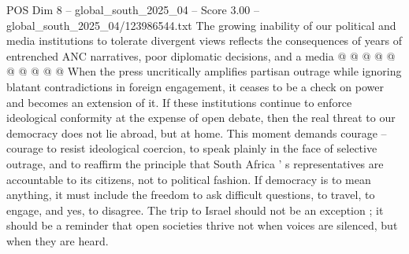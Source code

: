 \begin{textsample}{POS Dim 8 – global\_south\_2025\_04 – Score 3.00 – global\_south\_2025\_04/123986544.txt}
The growing inability of our political and media institutions to tolerate divergent views reflects the consequences of years of entrenched ANC narratives, poor diplomatic decisions, and a media @ @ @ @ @ @ @ @ @ @ When the press uncritically amplifies partisan outrage while ignoring blatant contradictions in foreign engagement, it ceases to be a check on power and becomes an extension of it.
If these institutions continue to enforce ideological conformity at the expense of open debate, then the real threat to our democracy does not lie abroad, but at home.
This moment demands courage -- courage to resist ideological coercion, to speak plainly in the face of selective outrage, and to reaffirm the principle that South Africa ' s representatives are accountable to its citizens, not to political fashion.
If democracy is to mean anything, it must include the freedom to ask difficult questions, to travel, to engage, and yes, to disagree.
The trip to Israel should not be an exception ; it should be a reminder that open societies thrive not when voices are silenced, but when they are heard.

\end{textsample}
